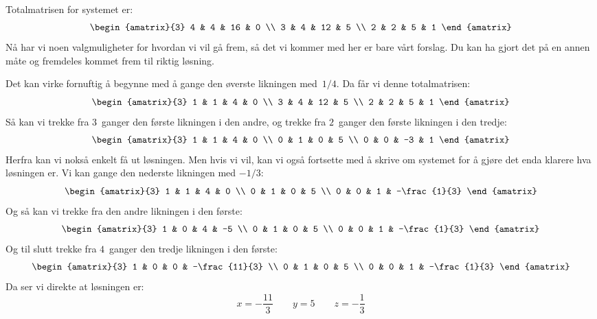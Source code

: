 \begin{losning}
Totalmatrisen for systemet er:
\[
\begin{amatrix}{3}
4 & 4 & 16 & 0 \\
3 & 4 & 12 & 5 \\
2 & 2 & 5 & 1
\end{amatrix}
\]
Nå har vi noen valgmuligheter for hvordan vi vil gå frem, så det vi
kommer med her er bare vårt forslag.  Du kan ha gjort det på en annen
måte og fremdeles kommet frem til riktig løsning.

Det kan virke fornuftig å begynne med å gange den øverste likningen
med~$1/4$.  Da får vi denne totalmatrisen:
\[
\begin{amatrix}{3}
1 & 1 & 4 & 0 \\
3 & 4 & 12 & 5 \\
2 & 2 & 5 & 1
\end{amatrix}
\]
Så kan vi trekke fra $3$~ganger den første likningen i den andre, og
trekke fra $2$~ganger den første likningen i den tredje:
\[
\begin{amatrix}{3}
1 & 1 & 4 & 0 \\
0 & 1 & 0 & 5 \\
0 & 0 & -3 & 1
\end{amatrix}
\]
Herfra kan vi nokså enkelt få ut løsningen.  Men hvis vi vil, kan vi
også fortsette med å skrive om systemet for å gjøre det enda klarere
hva løsningen er.  Vi kan gange den nederste likningen med $-1/3$:
\[
\begin{amatrix}{3}
1 & 1 & 4 & 0 \\
0 & 1 & 0 & 5 \\
0 & 0 & 1 & -\frac{1}{3}
\end{amatrix}
\]
Og så kan vi trekke fra den andre likningen i den første:
\[
\begin{amatrix}{3}
1 & 0 & 4 & -5 \\
0 & 1 & 0 & 5 \\
0 & 0 & 1 & -\frac{1}{3}
\end{amatrix}
\]
Og til slutt trekke fra $4$~ganger den tredje likningen i den første:
\[
\begin{amatrix}{3}
1 & 0 & 0 & -\frac{11}{3} \\
0 & 1 & 0 & 5 \\
0 & 0 & 1 & -\frac{1}{3}
\end{amatrix}
\]
Da ser vi direkte at løsningen er:
\[
x = -\frac{11}{3}
\qquad
y = 5
\qquad
z = -\frac{1}{3}
\]
\end{losning}


